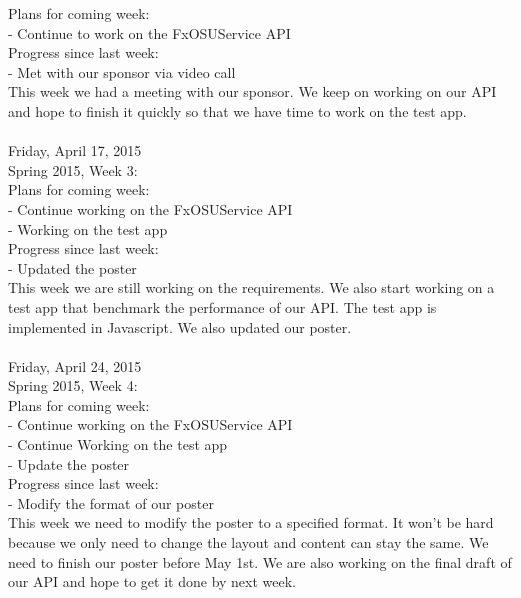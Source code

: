 {Plans for coming week: \\
- Continue to work on the FxOSUService API \\

Progress since last week: \\
- Met with our sponsor via video call \\

This week we had a meeting with our sponsor. We keep on working on our API and hope to finish it quickly so that we have time to work on the test app. \\

\hrulefill \\
Friday, April 17, 2015 \\
Spring 2015, Week 3: \\

Plans for coming week: \\
- Continue working on the FxOSUService API \\
- Working on the test app \\

Progress since last week: \\
- Updated the poster \\

This week we are still working on the requirements. We also start working on a test app that benchmark the performance of our API. The test app is implemented in Javascript. We also updated our poster. \\

\hrulefill \\
Friday, April 24, 2015 \\
Spring 2015, Week 4: \\

Plans for coming week: \\
- Continue working on the FxOSUService API \\
- Continue Working on the test app \\
- Update the poster \\

Progress since last week: \\
- Modify the format of our poster \\

This week we need to modify the poster to a specified format. It won't be hard because we only need to change the layout and content can stay the same. We need to finish our poster before May 1st. We are also working on the final draft of our API and hope to get it done by next week. \\

}
